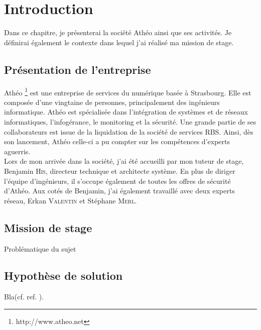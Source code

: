 \chapter{Introduction}
Dans ce chapitre, je présenterai la société Athéo ainsi que ses activités. Je définirai également le contexte dans lequel j'ai réalisé ma mission de stage. 

\section{Présentation de l'entreprise}
Athéo \footnote{http://www.atheo.net} est une entreprise de services du numérique basée à Strasbourg. Elle est composée d'une vingtaine de personnes, principalement des ingénieurs informatique. Athéo est spécialisée dans l'intégration de systèmes et de réseaux informatiques, l'infogérance, le monitoring et la sécurité. Une grande partie de ses collaborateurs est issue de la liquidation de la société de services RBS. Ainsi, dès son lancement, Athéo celle-ci a pu compter sur les compétences d'experts aguerris. \\

Lors de mon arrivée dans la société, j'ai été accueilli par mon tuteur de stage, Benjamin \textsc{His}, directeur technique et architecte système. En plus de diriger l'équipe d'ingénieurs, il s'occupe également de toutes les offres de sécurité d'Athéo. Aux cotés de Benjamin, j'ai également travaillé avec deux experts réseau, Erkan \textsc{Valentin} et Stéphane \textsc{Merl}. 

\section{Mission de stage}

\begin{center}
Problématique du sujet
\end{center}

\section{Hypothèse de solution}


Bla(cf. ref. \cite{cite6}).

